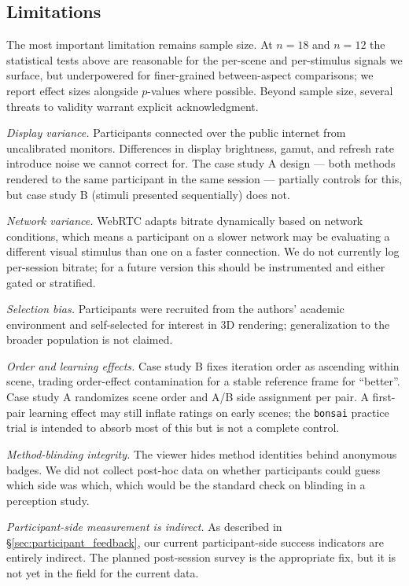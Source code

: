 \subsection{Limitations}
\label{sec:limitations}

The most important limitation remains sample size. At $n=18$ and
$n=12$ the statistical tests above are reasonable for the per-scene
and per-stimulus signals we surface, but underpowered for finer-grained
between-aspect comparisons; we report effect sizes alongside $p$-values
where possible. Beyond sample
size, several threats to validity warrant explicit acknowledgment.

\emph{Display variance.} Participants connected over the public
internet from uncalibrated monitors. Differences in display brightness,
gamut, and refresh rate introduce noise we cannot correct for. The
case study A design --- both methods rendered to the same participant
in the same session --- partially controls for this, but case study B
(stimuli presented sequentially) does not.

\emph{Network variance.} WebRTC adapts bitrate dynamically based on
network conditions, which means a participant on a slower network may
be evaluating a different visual stimulus than one on a faster
connection. We do not currently log per-session bitrate; for a future
version this should be instrumented and either gated or stratified.

\emph{Selection bias.} Participants were recruited from the authors'
academic environment and self-selected for interest in 3D rendering;
generalization to the broader population is not claimed.

\emph{Order and learning effects.} Case study B fixes iteration order
as ascending within scene, trading order-effect contamination for a
stable reference frame for ``better''. Case study A randomizes scene
order and A/B side assignment per pair. A first-pair learning effect
may still inflate ratings on early scenes; the \texttt{bonsai}
practice trial is intended to absorb most of this but is not a
complete control.

\emph{Method-blinding integrity.} The viewer hides method identities
behind anonymous badges. We did not collect post-hoc data on whether
participants could guess which side was which, which would be the
standard check on blinding in a perception study.

\emph{Participant-side measurement is indirect.} As described in
\S\ref{sec:participant_feedback}, our current participant-side
success indicators are entirely indirect. The planned post-session
survey is the appropriate fix, but it is not yet in the field for the
current data.
